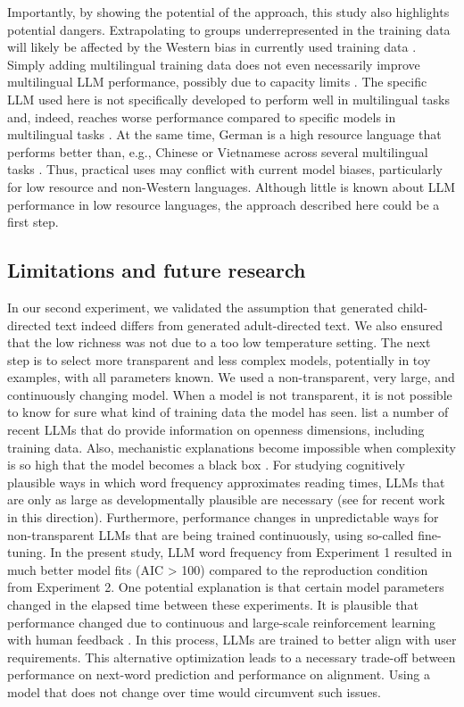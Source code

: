 \documentclass[doc, a4paper]{apa7}
\begin{document}
Importantly, by showing the potential of the approach, this study also highlights potential dangers. Extrapolating to groups underrepresented in the training data will likely be affected by the Western bias in currently used training data \citep{atari_which_2023}. Simply adding multilingual training data does not even necessarily improve multilingual LLM performance, possibly due to capacity limits \citep{chang_when_2023}. The specific LLM used here is not specifically developed to perform well in multilingual tasks and, indeed, reaches worse performance compared to specific models in multilingual tasks \citep{lai_chatgpt_2023}. At the same time, German is a high resource language that performs better than, e.g., Chinese or Vietnamese across several multilingual tasks \citep{lai_chatgpt_2023}. Thus, practical uses may conflict with current model biases, particularly for low resource and non-Western languages. Although little is known about LLM performance in low resource languages, the approach described here could be a first step. 


\subsection*{Limitations and future research}

In our second experiment, we validated the assumption that generated child-directed text indeed differs from generated adult-directed text. We also ensured that the low richness was not due to a too low temperature setting. The next step is to select more transparent and less complex models, potentially in toy examples, with all parameters known. We used a non-transparent, very large, and continuously changing model. When a model is not transparent, it is not possible to know for sure what kind of training data the model has seen. \citet{liesenfeld_opening_2023} list a number of recent LLMs that do provide information on openness dimensions, including training data. Also, mechanistic explanations become impossible when complexity is so high that the model becomes a black box \cite{bender_dangers_2021}. For studying cognitively plausible ways in which word frequency approximates reading times, LLMs that are only as large as developmentally plausible are necessary (see \citep{feng_is_2024, tan_devbench_2024, hu_auxiliary_2024} for recent work in this direction). Furthermore, performance changes in unpredictable ways for non-transparent LLMs that are being trained continuously, using so-called fine-tuning. In the present study, LLM word frequency from Experiment 1 resulted in much better model fits (AIC > 100) compared to the reproduction condition from Experiment 2. One potential explanation is that certain model parameters changed in the elapsed time between these experiments. It is plausible that performance changed due to continuous and large-scale reinforcement learning with human feedback \citep[RLHF][]{bai_training_2022, chung_scaling_2024, perez_red_2022, ziegler_fine-tuning_2020}. In this process, LLMs are trained to better align with user requirements. This alternative optimization leads to a necessary trade-off between performance on next-word prediction and performance on alignment. Using a model that does not change over time would circumvent such issues. 
\end{document}
